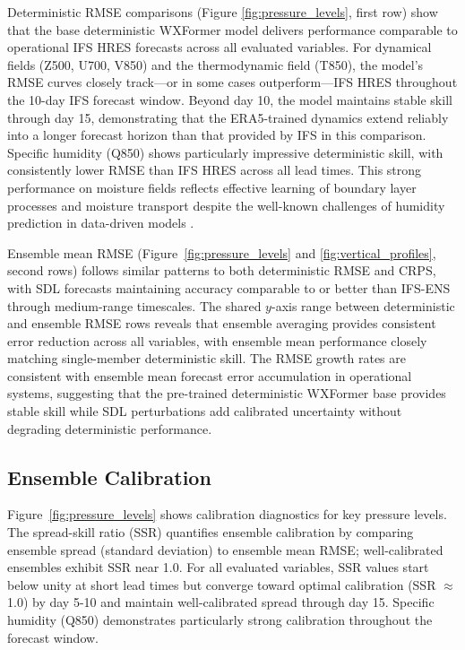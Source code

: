 \documentclass{agujournal2019}
\begin{document}
Deterministic RMSE comparisons (Figure \ref{fig:pressure_levels}, first row) show that the base deterministic WXFormer model delivers performance comparable to operational IFS HRES forecasts across all evaluated variables. For dynamical fields (Z500, U700, V850) and the thermodynamic field (T850), the model’s RMSE curves closely track—or in some cases outperform—IFS HRES throughout the 10-day IFS forecast window. Beyond day 10, the model maintains stable skill through day 15, demonstrating that the ERA5-trained dynamics extend reliably into a longer forecast horizon than that provided by IFS in this comparison. Specific humidity (Q850) shows particularly impressive deterministic skill, with consistently lower RMSE than IFS HRES across all lead times. This strong performance on moisture fields reflects effective learning of boundary layer processes and moisture transport despite the well-known challenges of humidity prediction in data-driven models \cite{bi2023pangu, Lam2023graphcast}.

Ensemble mean RMSE (Figure~\ref{fig:pressure_levels} and \ref{fig:vertical_profiles}, second rows) follows similar patterns to both deterministic RMSE and CRPS, with SDL forecasts maintaining accuracy comparable to or better than IFS-ENS through medium-range timescales. The shared $y$-axis range between deterministic and ensemble RMSE rows reveals that ensemble averaging provides consistent error reduction across all variables, with ensemble mean performance closely matching single-member deterministic skill. The RMSE growth rates are consistent with ensemble mean forecast error accumulation in operational systems, suggesting that the pre-trained deterministic WXFormer base provides stable skill while SDL perturbations add calibrated uncertainty without degrading deterministic performance.

\subsection{Ensemble Calibration}

Figure~\ref{fig:pressure_levels} shows calibration diagnostics for key pressure levels. The spread-skill ratio (SSR) quantifies ensemble calibration by comparing ensemble spread (standard deviation) to ensemble mean RMSE; well-calibrated ensembles exhibit SSR near 1.0. For all evaluated variables, SSR values start below unity at short lead times but converge toward optimal calibration (SSR $\approx$ 1.0) by day 5-10 and maintain well-calibrated spread through day 15. Specific humidity (Q850) demonstrates particularly strong calibration throughout the forecast window.
\end{document}
